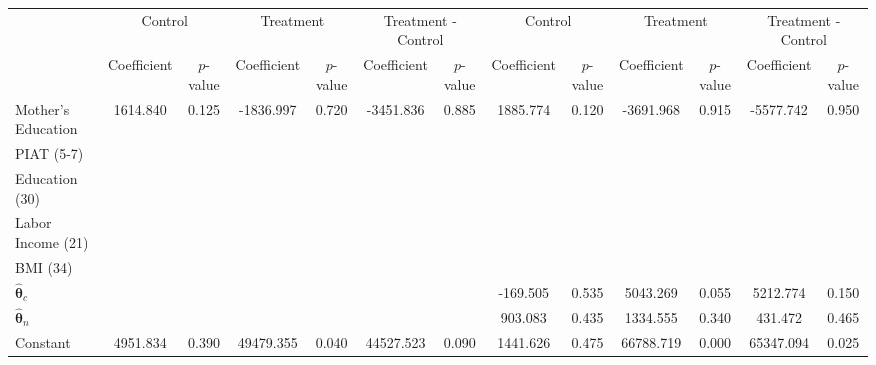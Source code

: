 \begin{tabular}{lcccccccccccc} \toprule
&\multicolumn{2}{c}{Control} & \multicolumn{2}{c}{Treatment} & \multicolumn{2}{c}{Treatment - Control} & \multicolumn{2}{c}{Control} & \multicolumn{2}{c}{Treatment} & \multicolumn{2}{c}{Treatment - Control} \\
 & Coefficient  & $p$-value  & Coefficient  & $p$-value & Coefficient  & $p$-value  & Coefficient  & $p$-value  & Coefficient  & $p$-value  & Coefficient  & $p$-value \\ \midrule
Mother's Education &  1614.840 &     0.125 & -1836.997 &     0.720 & -3451.836 &     0.885 &  1885.774 &     0.120 & -3691.968 &     0.915 & -5577.742 &     0.950 \\  
PIAT (5-7) &         &         &         &         &         &         &         &         &         &         &         &          \\  
Education (30)  &         &         &         &         &         &         &         &         &         &         &         &         \\  
Labor Income (21)  &         &         &         &         &         &         &         &         &         &         &         &         \\  
BMI (34)  &         &         &         &         &         &         &         &         &         &         &         &         \\  
$\hat{\bm{\theta}}_c$ &         &         &         &         &         &         &  -169.505 &     0.535 &  5043.269 &     0.055 &  5212.774 &     0.150 \\  
$\hat{\bm{\theta}}_n$ &         &         &         &         &         &         &   903.083 &     0.435 &  1334.555 &     0.340 &   431.472 &     0.465 \\  
Constant &  4951.834 &     0.390 & 49479.355 &     0.040 & 44527.523 &     0.090 &  1441.626 &     0.475 & 66788.719 &     0.000 & 65347.094 &     0.025 \\  
\bottomrule \end{tabular}